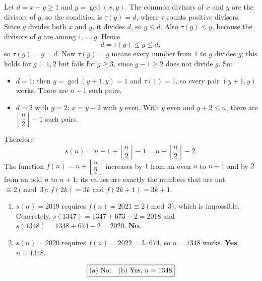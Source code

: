 Let $d=x-y\ge1$ and $g=\gcd(x,y)$. The common divisors of $x$ and $y$ are the divisors of $g$, so the condition is $\tau(g)=d$, where $\tau$ counts positive divisors. Since $g$ divides both $x$ and $y$, it divides $d$, so $g\le d$. Also $\tau(g)\le g$, because the divisors of $g$ are among $1,\dots,g$. Hence
\[d=\tau(g)\le g\le d,\]
so $\tau(g)=g=d$. Now $\tau(g)=g$ means every number from $1$ to $g$ divides $g$; this holds for $g=1,2$ but fails for $g\ge3$, since $g-1\ge2$ does not divide $g$. So:
\begin{itemize}
\item $d=1$: then $g=\gcd(y+1,y)=1$ and $\tau(1)=1$, so every pair $(y+1,y)$ works. There are $n-1$ such pairs.
\item $d=2$ with $g=2$: $x=y+2$ with $y$ even. With $y$ even and $y+2\le n$, there are $\left\lfloor\dfrac {n}{2}\right\rfloor-1$ such pairs.
\end{itemize}
Therefore
\[s(n)=n-1+\left\lfloor\dfrac {n}{2}\right\rfloor-1=n+\left\lfloor\dfrac {n}{2}\right\rfloor-2 .\]
The function $f(n)=n+\left\lfloor\dfrac {n}{2}\right\rfloor$ increases by $1$ from an even $n$ to $n+1$ and by $2$ from an odd $n$ to $n+1$; its values are exactly the numbers that are not $\equiv2\pmod3$: $f(2k)=3k$ and $f(2k+1)=3k+1$.
\begin{enumerate}
\item $s(n)=2019$ requires $f(n)=2021\equiv2\pmod3$, which is impossible. Concretely, $s(1347)=1347+673-2=2018$ and $s(1348)=1348+674-2=2020$. \textbf{No.}
\item $s(n)=2020$ requires $f(n)=2022=3\cdot674$, so $n=1348$ works. \textbf{Yes}, $n=1348$.
\end{enumerate}
\[\boxed{\text{(a) No;\quad (b) Yes, } n=1348}\]
